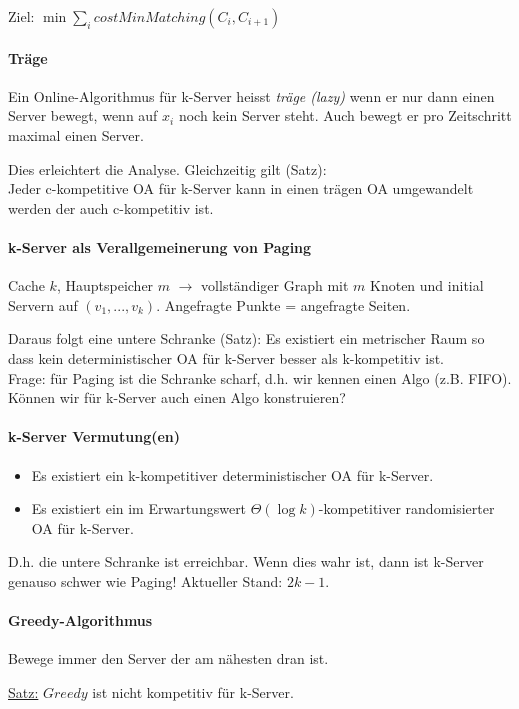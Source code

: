 Ziel: $\min \sum_i costMinMatching(C_i, C_{i+1})$

\paragraph{Träge}
Ein Online-Algorithmus für k-Server heisst \emph{träge (lazy)} wenn er nur dann einen Server bewegt,
wenn auf $x_i$ noch kein Server steht.
Auch bewegt er pro Zeitschritt maximal einen Server.

Dies erleichtert die Analyse. Gleichzeitig gilt (Satz): \\
Jeder c-kompetitive OA für k-Server kann in einen trägen OA umgewandelt werden der auch c-kompetitiv ist.

\paragraph{k-Server als Verallgemeinerung von Paging}
Cache $k$, Hauptspeicher $m$ $\longrightarrow$ vollständiger Graph mit $m$ Knoten und initial
Servern auf $(v_1, ..., v_k)$. Angefragte Punkte = angefragte Seiten.

Daraus folgt eine untere Schranke (Satz):
Es existiert ein metrischer Raum so dass kein deterministischer OA für k-Server besser als k-kompetitiv ist.
\\
Frage: für Paging ist die Schranke scharf, d.h. wir kennen einen Algo (z.B. FIFO).
Können wir für k-Server auch einen Algo konstruieren?

\paragraph{k-Server Vermutung(en)}
\begin{itemize}
    \item Es existiert ein k-kompetitiver deterministischer OA für k-Server.
    \item Es existiert ein im Erwartungswert $\Theta(\log k)$-kompetitiver randomisierter OA für k-Server.
\end{itemize}
D.h. die untere Schranke ist erreichbar.
Wenn dies wahr ist, dann ist k-Server genauso schwer wie Paging!
Aktueller Stand: $2k-1$.

\paragraph{Greedy-Algorithmus}
Bewege immer den Server der am nähesten dran ist.

\underline{Satz:}
$Greedy$ ist nicht kompetitiv für k-Server.

